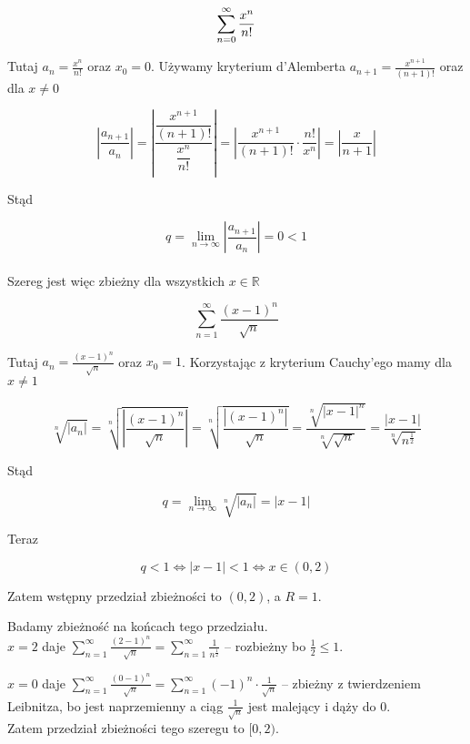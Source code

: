 \begin{przyklad}

$$ \sum\limits_{n = 0}^{\infty} \frac{x^n}{n!} $$

Tutaj $ a_n = \frac{x^n}{n!} $ oraz $ x_0 = 0 $. Używamy kryterium d'Alemberta $ a_{n+1} = \frac{x^{n+1}}{(n+1)!} $ oraz
dla $x \neq 0$

$$ \left| \frac{a_{n+1}}{a_n} \right| = \left| \frac{ \dfrac{x^{ n+1 }}{ (n+1)! } }{ \dfrac{ x^n }{ n! } } \right| 
= \left| \frac{x^{n+1}}{(n+1)!} \cdot \frac{n!}{x^n} \right| = \left| \frac{x}{n+1} \right| $$

Stąd

$$ q = \lim_{n \to \infty} \left| \frac{a_{n+1}}{a_n} \right| = 0 < 1 $$ \\

Szereg jest więc zbieżny dla wszystkich $ x \in \mathbb{R} $
\end{przyklad}

\begin{przyklad}

$$ \sum\limits_{n = 1}^{\infty} \frac{(x - 1)^n}{\sqrt{n}} $$

Tutaj $ a_n = \frac{(x - 1)^n}{\sqrt{n}} $ oraz $ x_0 = 1 $. Korzystając z kryterium Cauchy'ego mamy dla $x \neq 1$

$$ \sqrt[n]{|a_n|} = \sqrt[n]{ \left| \frac{(x-1)^n}{\sqrt{n}} \right| } = \sqrt[n]{ \frac{\left|(x-1)^n \right|}{\sqrt{n}} }
= \frac{ \sqrt[n]{|x-1|^n} }{ \sqrt[n]{\sqrt{n}} } = \frac{|x-1|}{\sqrt[n]{n^{\frac{1}{2}}}}$$

Stąd

$$ q = \lim_{n \to \infty} \sqrt[n]{|a_n|} = |x-1| $$

Teraz

$$ q < 1 \Leftrightarrow |x - 1| < 1 \Leftrightarrow x \in (0, 2) $$

Zatem wstępny przedział zbieżności to $(0, 2)$, a $R = 1$.

Badamy zbieżność na końcach tego przedziału. \\

$x = 2$ daje $ \sum\limits_{n = 1}^{\infty} \frac{(2 - 1)^n}{\sqrt{n}} = \sum\limits_{n = 1}^{\infty} \frac{1}{n^{\frac{1}{2}}} $
-- rozbieżny bo $ \frac{1}{2} \leq 1 $.

$x = 0$ daje $ \sum\limits_{n = 1}^{\infty} \frac{(0 - 1)^n}{\sqrt{n}} = \sum\limits_{n = 1}^{\infty} (-1)^n \cdot \frac{1}{\sqrt{n}} $
-- zbieżny z twierdzeniem Leibnitza, bo jest naprzemienny a ciąg $ \frac{1}{\sqrt{n}} $ jest malejący i dąży do $0$. \\

Zatem przedział zbieżności tego szeregu to $[0, 2)$. \\
\end{przyklad}

